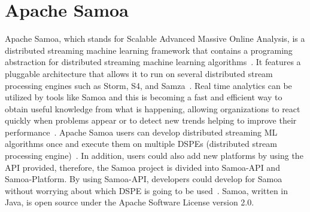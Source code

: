 \section{Apache Samoa}
Apache Samoa, which stands for Scalable Advanced Massive Online Analysis, is a distributed 
streaming machine learning framework that contains a programing abstraction for distributed 
streaming machine learning algorithms~\cite{hid-sp18-405-www-samoa}. It features a pluggable 
architecture that allows it to run on several distributed stream processing engines such as Storm, S4, 
and Samza~\cite{hid-sp18-405-www-samoa}. Real time analytics can be utilized by tools like Samoa 
and this is becoming a fast and efficient way to obtain useful knowledge from what is happening, 
allowing organizations to react quickly when problems appear or to detect new trends helping to 
improve their performance~\cite{hid-sp18-405-bif2015mining-samoa}. Apache Samoa users can 
develop distributed streaming ML algorithms once and execute them on multiple DSPEs (distributed 
stream processing engine)~\cite{hid-sp18-405-mor2015samoa-samoa}. In addition, users could also 
add new platforms by using the API provided, therefore, the Samoa project is divided into Samoa-API 
and Samoa-Platform. By using Samoa-API, developers could develop for Samoa without worrying about 
which DSPE is going to be used~\cite{hid-sp18-405-blog-samoa}. Samoa, written in Java, is open 
source under the Apache Software License version 2.0.


